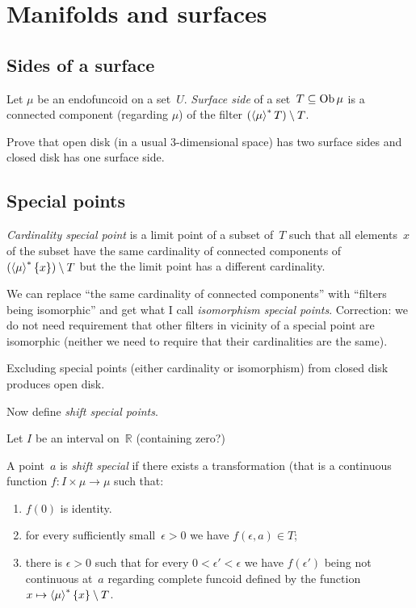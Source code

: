 \chapter{Manifolds and surfaces}

\section{Sides of a surface}

\begin{defn}
Let $\mu$ be an endofuncoid on a set~$U$.
\emph{Surface side} of a set~$T\subseteq\operatorname{Ob}\mu$ is a connected component
(regarding $\mu$) of the filter $(\left\langle \mu\right\rangle ^{\ast}T)\setminus T$.
\end{defn}

\begin{xca}
Prove that open disk (in a usual 3-dimensional space) has two surface sides
and closed disk has one surface side.
\end{xca}

\section{Special points}

\begin{defn}
\emph{Cardinality special point} is  a limit point of a subset of~$T$ such
that all elements~$x$ of the subset have the same cardinality of connected
components of $(\left\langle \mu\right\rangle ^{\ast}\{x\})\setminus T$ but the the limit point has
a different cardinality.
\end{defn}

We can replace ``the same cardinality of connected components'' with
``filters being isomorphic'' and get what I call
\emph{isomorphism special points}. Correction: we do not need requirement
that other filters in vicinity of a special point are isomorphic
(neither we need to require that their cardinalities are the same).

\begin{xca}
Excluding special points (either cardinality or isomorphism) from closed disk
produces open disk.
\end{xca}

Now define \emph{shift special points}.

Let $I$ be an interval on~$\mathbb{R}$ (containing zero?)

A point~$a$ is \emph{shift special} if there exists a transformation
(that is a continuous function $f:I\times\mu\to\mu$ such that:
\begin{enumerate}
  \item $f(0)$ is identity. 
  \item for every sufficiently small~$\epsilon>0$ we have $f(\epsilon,a)\in T$;
  \item there is $\epsilon>0$ such that for every $0<\epsilon'<\epsilon$ we have
    $f(\epsilon')$ being not continuous at~$a$ regarding complete funcoid
    defined by the function $x\mapsto\left\langle \mu\right\rangle ^{\ast}\{x\}\setminus T$.
\end{enumerate}


